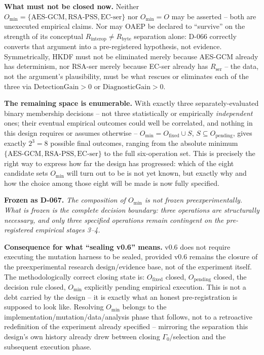 \documentclass[11pt,a4paper]{article}
\begin{document}
\textbf{What must not be closed now.} Neither $O_{\min}=\{\text{AES-GCM},\text{RSA-PSS},\text{EC-ser}\}$ nor $O_{\min}=O$ may be asserted -- both are unexecuted empirical claims. Nor may OAEP be declared to ``survive'' on the strength of its conceptual $R_{\text{interop}}\neq R_{\text{byte}}$ separation alone: D-066 correctly converts that argument into a pre-registered hypothesis, not evidence. Symmetrically, HKDF must not be eliminated merely because AES-GCM already has determinism, nor RSA-ser merely because EC-ser already has $R_{\text{ser}}$ -- the data, not the argument's plausibility, must be what rescues or eliminates each of the three via $\text{DetectionGain}>0$ or $\text{DiagnosticGain}>0$.

\textbf{The remaining space is enumerable.} With exactly three separately-evaluated binary membership decisions -- not three statistically or empirically \emph{independent} ones; their eventual empirical outcomes could well be correlated, and nothing in this design requires or assumes otherwise -- $O_{\min} = O_{\text{fixed}} \cup S$, $S\subseteq O_{\text{pending}}$, gives exactly $2^3=8$ possible final outcomes, ranging from the absolute minimum $\{\text{AES-GCM},\text{RSA-PSS},\text{EC-ser}\}$ to the full six-operation set. This is precisely the right way to express how far the design has progressed: which of the eight candidate sets $O_{\min}$ will turn out to be is not yet known, but exactly why and how the choice among those eight will be made is now fully specified.

\textbf{Frozen as D-067.} \emph{The composition of $O_{\min}$ is not frozen preexperimentally. What is frozen is the complete decision boundary: three operations are structurally necessary, and only three specified operations remain contingent on the pre-registered empirical stages 3--4.}

\textbf{Consequence for what ``sealing v0.6'' means.} v0.6 does not require executing the mutation harness to be sealed, provided v0.6 remains the closure of the preexperimental research design/evidence base, not of the experiment itself. The methodologically correct closing state is: $O_{\text{fixed}}$ closed, $O_{\text{pending}}$ closed, the decision rule closed, $O_{\min}$ explicitly pending empirical execution. This is not a debt carried by the design -- it is exactly what an honest pre-registration is supposed to look like. Resolving $O_{\min}$ belongs to the implementation/mutation/data/analysis phase that follows, not to a retroactive redefinition of the experiment already specified -- mirroring the separation this design's own history already drew between closing $\Gamma_0$/selection and the subsequent execution phase.
\end{document}

